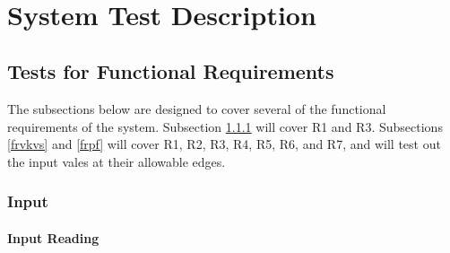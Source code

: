 \documentclass[12pt, titlepage]{article}
\begin{document}
~\newpage	 

\section{System Test Description} \label{systest}

\subsection{Tests for Functional Requirements}

\label{testfr}

The subsections below are designed to cover several of the functional
requirements of the system. Subsection \ref{frinput} will cover R1 and
R3. Subsections \ref{frvkvs} and \ref{frpf} will cover R1, R2, R3, R4, R5, R6,
and R7, and will test out the input vales at their allowable edges.

\subsubsection{Input}
\label{frinput}
		
\paragraph{Input Reading}
\end{document}
